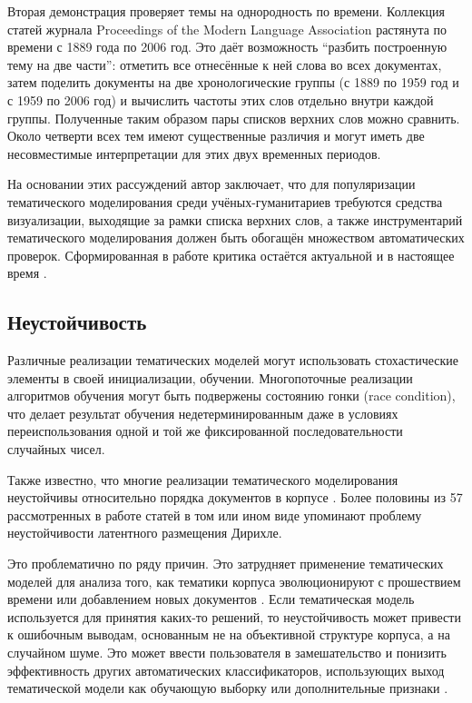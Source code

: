 Вторая демонстрация проверяет темы на однородность по времени. Коллекция статей журнала Proceedings of the Modern Language Association растянута по времени с 1889 года по 2006 год. Это даёт возможность ``разбить построенную тему на две части'': отметить все отнесённые к ней слова во всех документах, затем поделить документы на две хронологические группы (с 1889 по 1959 год и с 1959 по 2006 год) и вычислить частоты этих слов отдельно внутри каждой группы. Полученные таким образом пары списков верхних слов можно сравнить. Около четверти всех тем имеют существенные различия и могут иметь две несовместимые интерпретации для этих двух временных периодов. 

На основании этих рассуждений автор заключает, что для популяризации тематического моделирования среди учёных-гуманитариев требуются средства визуализации, выходящие за рамки списка верхних слов, а также инструментарий тематического моделирования должен быть обогащён множеством автоматических проверок. Сформированная в работе критика остаётся актуальной и в настоящее время \cite{paakkonen2020humanistic}. 

\subsection{Неустойчивость}

Различные реализации тематических моделей могут использовать стохастические элементы в своей инициализации, обучении. Многопоточные реализации алгоритмов обучения могут быть подвержены состоянию гонки (race condition), что делает результат обучения недетерминированным даже в условиях переиспользования одной и той же фиксированной последовательности случайных чисел.

Также известно, что многие реализации тематического моделирования неустойчивы относительно порядка документов в корпусе \cite{agrawal2018wrong}. Более половины из 57 рассмотренных в работе \cite{agrawal2018wrong} статей в том или ином виде упоминают проблему неустойчивости латентного размещения Дирихле.

Это проблематично по ряду причин. Это затрудняет применение тематических моделей для анализа того, как тематики корпуса эволюционируют с прошествием времени или добавлением новых документов \cite{mehta_clustering_bank}. Если тематическая модель используется для принятия каких-то решений, то неустойчивость может привести к ошибочным выводам, основанным не на объективной структуре корпуса, а на случайном шуме\cite{mantyla2018measuring}. Это может ввести пользователя в замешательство и понизить эффективность других автоматических классификаторов, использующих выход тематической модели как обучающую выборку или дополнительные признаки \cite{agrawal2018wrong}.

